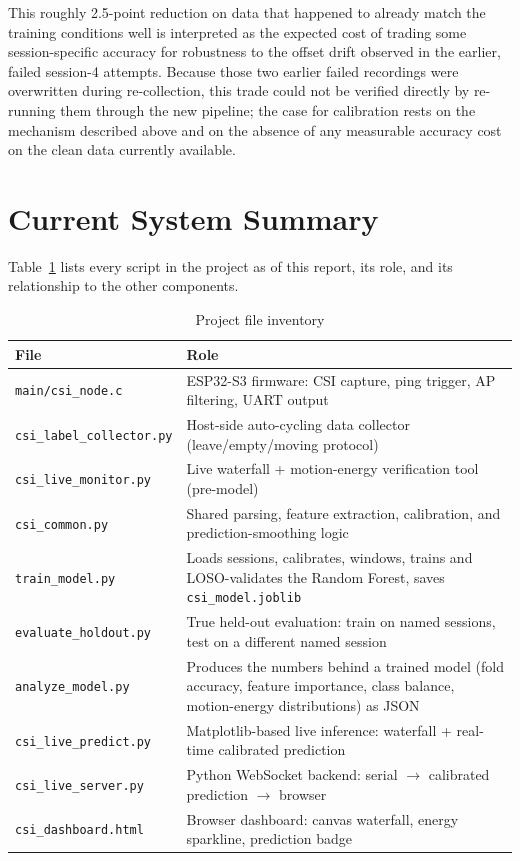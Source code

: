 \documentclass[11pt,a4paper]{article}
\begin{document}
This roughly 2.5-point reduction on data that happened to already match
the training conditions well is interpreted as the expected cost of
trading some session-specific accuracy for robustness to the offset
drift observed in the earlier, failed session-4 attempts. Because those
two earlier failed recordings were overwritten during re-collection,
this trade could not be verified directly by re-running them through the
new pipeline; the case for calibration rests on the mechanism described
above and on the absence of any measurable accuracy cost on the clean
data currently available.

\section{Current System Summary}

Table~\ref{tab:inventory} lists every script in the project as of this
report, its role, and its relationship to the other components.

\begin{table}[h]
\centering
\small
\begin{tabular}{p{4.2cm}p{9.5cm}}
\toprule
\textbf{File} & \textbf{Role} \\
\midrule
\texttt{main/csi\_node.c} & ESP32-S3 firmware: CSI capture, ping trigger, AP filtering, UART output \\
\texttt{csi\_label\_collector.py} & Host-side auto-cycling data collector (leave/empty/moving protocol) \\
\texttt{csi\_live\_monitor.py} & Live waterfall + motion-energy verification tool (pre-model) \\
\texttt{csi\_common.py} & Shared parsing, feature extraction, calibration, and prediction-smoothing logic \\
\texttt{train\_model.py} & Loads sessions, calibrates, windows, trains and LOSO-validates the Random Forest, saves \texttt{csi\_model.joblib} \\
\texttt{evaluate\_holdout.py} & True held-out evaluation: train on named sessions, test on a different named session \\
\texttt{analyze\_model.py} & Produces the numbers behind a trained model (fold accuracy, feature importance, class balance, motion-energy distributions) as JSON \\
\texttt{csi\_live\_predict.py} & Matplotlib-based live inference: waterfall + real-time calibrated prediction \\
\texttt{csi\_live\_server.py} & Python WebSocket backend: serial $\to$ calibrated prediction $\to$ browser \\
\texttt{csi\_dashboard.html} & Browser dashboard: canvas waterfall, energy sparkline, prediction badge \\
\bottomrule
\end{tabular}
\caption{Project file inventory}
\label{tab:inventory}
\end{table}
\end{document}
